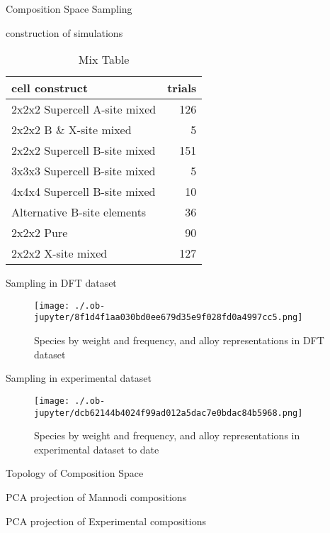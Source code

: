 \documentclass[9pt, compress]{beamer}
\begin{document}
\begin{frame}[allowframebreaks]{Composition Space Sampling}
\begin{block}{construction of simulations}
\begin{table}[htbp]
\caption{\label{tbl:mixing} Mix Table}
\centering
\begin{tabular}{lr}
cell construct & trials\\
\hline
2x2x2 Supercell A-site mixed & 126\\
2x2x2 B \& X-site mixed & 5\\
2x2x2 Supercell B-site mixed & 151\\
3x3x3 Supercell B-site mixed & 5\\
4x4x4 Supercell B-site mixed & 10\\
Alternative B-site elements & 36\\
2x2x2 Pure & 90\\
2x2x2 X-site mixed & 127\\
\end{tabular}
\end{table}
\end{block}
\begin{block}{Sampling in DFT dataset}
\begin{figure}[htbp]
\centering
\texttt{[image: ./.ob-jupyter/8f1d4f1aa030bd0ee679d35e9f028fd0a4997cc5.png]}
\caption{\label{fig:dft_rep} Species by weight and frequency, and alloy representations in DFT dataset}
\end{figure}
\end{block}
\begin{block}{Sampling in experimental dataset}
\begin{figure}[htbp]
\centering
\texttt{[image: ./.ob-jupyter/dcb62144b4024f99ad012a5dac7e0bdac84b5968.png]}
\caption{\label{fig:exp_rep} Species by weight and frequency, and alloy representations in experimental dataset to date}
\end{figure}
\end{block}
\end{frame}
\begin{frame}[allowframebreaks]{Topology of Composition Space}
\begin{block}{PCA projection of Mannodi compositions}
\end{block}

\begin{block}{PCA projection of Experimental compositions}
\end{block}
\end{frame}
\end{document}
